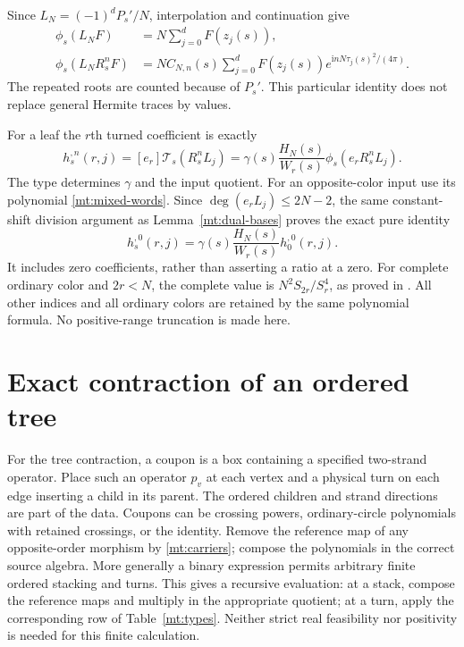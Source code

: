 \documentclass[11pt]{article}
\numberwithin{equation}{section}
\theoremstyle{definition}\newtheorem{definition}[theorem]{Definition}
\theoremstyle{remark}\newtheorem{remark}[theorem]{Remark}
\newcommand{\ii}{\mathrm i}
\newcommand{\Turn}{\mathscr T}
\begin{document}
Since $L_N=(-1)^dP_s'/N$, interpolation and continuation give
\begin{equation}\label{mt:circle-grid}
\begin{aligned}
 \phi_s(L_NF)&=N\sum_{j=0}^dF(z_j(s)),\\
 \phi_s(L_NR_s^nF)&=N C_{N,n}(s)
       \sum_{j=0}^dF(z_j(s))e^{\ii nN\tau_j(s)^2/(4\pi)}.
\end{aligned}
\end{equation}
The repeated roots are counted because of $P_s'$. This particular
identity does not replace general Hermite traces by values.

For a leaf the $r$th turned coefficient is exactly
\begin{equation}\label{mt:leaf}
 h_s^{,n}(r,j)=[e_r]\Turn_s(R_s^nL_j)
   =\gamma(s)\frac{H_N(s)}{W_r(s)}\phi_s(e_rR_s^nL_j).
\end{equation}
The type determines $\gamma$ and the input quotient. For an
opposite-color input use its polynomial \eqref{mt:mixed-words}.
Since $\deg(e_rL_j)\le2N-2$, the same constant-shift division
argument as Lemma~\ref{mt:dual-bases} proves the exact pure identity
\begin{equation}\label{mt:pure-leaf}
 h_s^{,0}(r,j)=\gamma(s)\frac{H_N(s)}{W_r(s)}h_0^{,0}(r,j).
\end{equation}
It includes zero coefficients, rather than asserting a ratio at a
zero. For complete ordinary color and $2r<N$, the complete value is
$N^2S_{2r}/S_r^4$, as proved in \cite[Section~4]{Newton}. All other
indices and all ordinary colors are retained by the same polynomial
formula. No positive-range truncation is made here.

\section{Exact contraction of an ordered tree}
For the tree contraction, a coupon is a box containing a specified
two-strand operator. Place such an operator $p_v$ at
each vertex and a physical turn on each edge inserting a child in
its parent. The ordered children and strand directions are part of
the data. Coupons can be crossing powers, ordinary-circle
polynomials with retained crossings, or the identity. Remove the
reference map of any opposite-order morphism by \eqref{mt:carriers};
compose the polynomials in the correct source algebra. More
generally a binary expression permits arbitrary finite ordered
stacking and turns. This gives a recursive evaluation: at a stack, compose the reference
maps and multiply in the appropriate quotient; at a turn, apply the
corresponding row of Table~\ref{mt:types}. Neither strict real
feasibility nor positivity is needed for this finite calculation.
\end{document}

